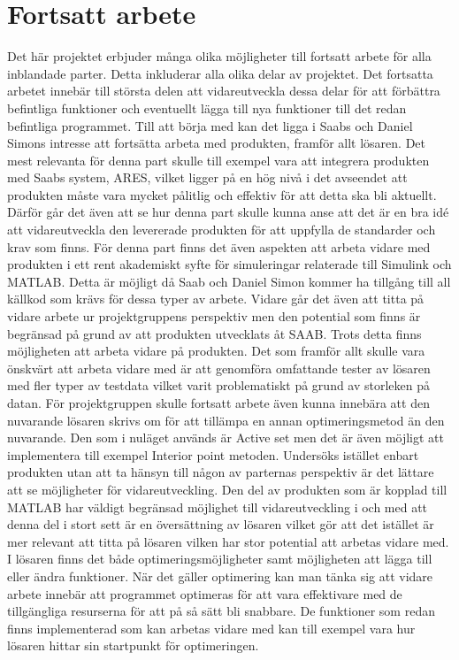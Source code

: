 \section{Fortsatt arbete}
Det här projektet erbjuder många olika möjligheter till fortsatt arbete för alla inblandade parter. Detta inkluderar alla olika delar av projektet. Det fortsatta arbetet innebär till största delen att vidareutveckla dessa delar för att förbättra befintliga funktioner och eventuellt lägga till nya funktioner till det redan befintliga programmet. 
\newline \newline
Till att börja med kan det ligga i Saabs och Daniel Simons intresse att fortsätta arbeta med produkten, framför allt lösaren. Det mest relevanta för denna part skulle till exempel vara att integrera produkten med Saabs system, ARES, vilket ligger på en hög nivå i det avseendet att produkten måste vara mycket pålitlig och effektiv för att detta ska bli aktuellt. Därför går det även att se hur denna part skulle kunna anse att det är en bra idé att vidareutveckla den levererade produkten för att uppfylla de standarder och krav som finns. För denna part finns det även aspekten att arbeta vidare med produkten i ett rent akademiskt syfte för simuleringar relaterade till Simulink och MATLAB. Detta är möjligt då Saab och Daniel Simon kommer ha tillgång till all källkod som krävs för dessa typer av arbete.
\newline \newline
Vidare går det även att titta på vidare arbete ur projektgruppens perspektiv men den potential som finns är begränsad på grund av att produkten utvecklats åt SAAB. Trots detta finns möjligheten att arbeta vidare på produkten. Det som framför allt skulle vara önskvärt att arbeta vidare med är att genomföra omfattande tester av lösaren med fler typer av testdata vilket varit problematiskt på grund av storleken på datan. För projektgruppen skulle fortsatt arbete även kunna innebära att den nuvarande lösaren skrivs om för att tillämpa en annan optimeringsmetod än den nuvarande. Den som i nuläget används är Active set men det är även möjligt att implementera till exempel Interior point metoden.
\newline \newline
Undersöks istället enbart produkten utan att ta hänsyn till någon av parternas perspektiv är det lättare att se möjligheter för vidareutveckling. Den del av produkten som är kopplad till MATLAB har väldigt begränsad möjlighet till vidareutveckling i och med att denna del i stort sett är en översättning av lösaren vilket gör att det istället är mer relevant att titta på lösaren vilken har stor potential att arbetas vidare med. I lösaren finns det både optimeringsmöjligheter samt möjligheten att lägga till eller ändra funktioner. När det gäller optimering kan man tänka sig att vidare arbete innebär att programmet optimeras för att vara effektivare med de tillgängliga resurserna för att på så sätt bli snabbare. De funktioner som redan finns implementerad som kan arbetas vidare med kan till exempel vara hur lösaren hittar sin startpunkt för optimeringen.

